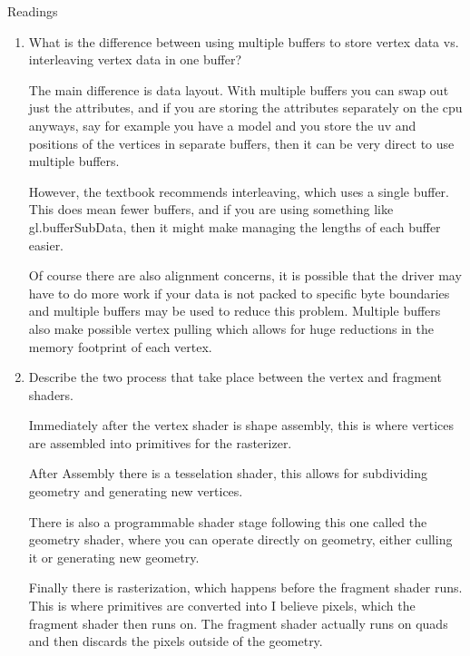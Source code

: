 \documentclass{article}
\begin{document}
    {\large Readings}
    \begin{enumerate}
        \item What is the difference between using multiple buffers to store vertex data vs. interleaving vertex
            data in one buffer?
            \begin{mdframed}
                The main difference is data layout. With multiple buffers you can
                swap out just the attributes, and if you are storing the attributes separately on
                the cpu anyways, say for example you have a model and you store the uv and positions of
                the vertices in separate buffers, then it can be very direct to use multiple buffers.

                However, the textbook recommends interleaving, which uses a single buffer. This does
                mean fewer buffers, and if you are using something like gl.bufferSubData, then it
                might make managing the lengths of each buffer easier.

                Of course there are also alignment concerns, it is possible that the driver may have to do
                more work if your data is not packed to specific byte boundaries and multiple buffers may be
                used to reduce this problem. Multiple buffers also make possible vertex pulling which allows
                for huge reductions in the memory footprint of each vertex.
            \end{mdframed}

        \item Describe the two process that take place between the vertex and fragment shaders.
            \begin{mdframed}
                Immediately after the vertex shader is shape assembly, this is where vertices are assembled into primitives
                for the rasterizer. 

                After Assembly there is a tesselation shader, this allows for subdividing geometry and generating new vertices.

                There is also a programmable shader stage following this one called the geometry shader,
                where you can operate directly on geometry, either culling it or generating new geometry.

                Finally there is rasterization, which happens before the fragment shader runs. This is where primitives
                are converted into I believe pixels, which the fragment shader then runs on. The fragment shader actually
                runs on quads and then discards the pixels outside of the geometry.
            \end{mdframed}


\end{enumerate}
\end{document}
